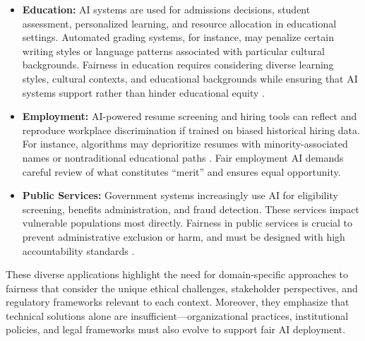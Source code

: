 \documentclass[12pt,a4paper,openright,twoside]{book}
\begin{document}
\begin{itemize}
    \item \textbf{Education:} AI systems are used for admissions decisions, student assessment, personalized learning, and resource allocation in educational settings. Automated grading systems, for instance, may penalize certain writing styles or language patterns associated with particular cultural backgrounds. Fairness in education requires considering diverse learning styles, cultural contexts, and educational backgrounds while ensuring that AI systems support rather than hinder educational equity \cite{mehrabi2021survey}.
    
    \item \textbf{Employment:} AI-powered resume screening and hiring tools can reflect and reproduce workplace discrimination if trained on biased historical hiring data. For instance, algorithms may deprioritize resumes with minority-associated names or nontraditional educational paths \cite{Chen2023}. Fair employment AI demands careful review of what constitutes “merit” and ensures equal opportunity.
    
    \item \textbf{Public Services:} Government systems increasingly use AI for eligibility screening, benefits administration, and fraud detection. These services impact vulnerable populations most directly. Fairness in public services is crucial to prevent administrative exclusion or harm, and must be designed with high accountability standards \cite{suresh2021framework}.
\end{itemize}

These diverse applications highlight the need for domain-specific approaches to fairness that consider the unique ethical challenges, stakeholder perspectives, and regulatory frameworks relevant to each context. Moreover, they emphasize that technical solutions alone are insufficient—organizational practices, institutional policies, and legal frameworks must also evolve to support fair AI deployment.
\end{document}
